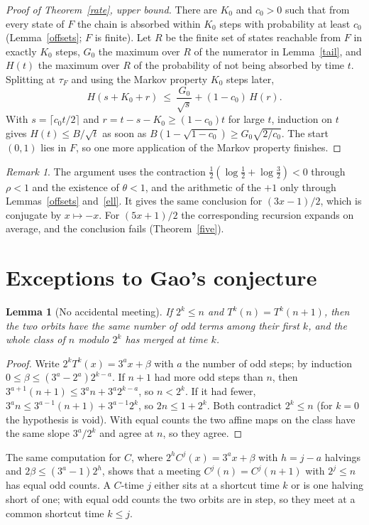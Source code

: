\documentclass[11pt]{article}
\newtheorem{lemma}[theorem]{Lemma}
\theoremstyle{remark}
\newtheorem{remark}[theorem]{Remark}
\begin{document}
\begin{proof}[Proof of Theorem~\ref{rate}, upper bound]
There are $K_0$ and $c_0>0$ such that from every state of $F$ the chain is absorbed within $K_0$
steps with probability at least $c_0$ (Lemma~\ref{offsets}; $F$ is finite). Let $R$ be the finite
set of states reachable from $F$ in exactly $K_0$ steps, $G_0$ the maximum over $R$ of the
numerator in Lemma~\ref{tail}, and $H(t)$ the maximum over $R$ of the probability of not being
absorbed by time $t$. Splitting at $\tau_F$ and using the Markov property $K_0$ steps later,
\[
H(s+K_0+r)\ \le\ \frac{G_0}{\sqrt s}+(1-c_0)\,H(r).
\]
With $s=\lceil c_0t/2\rceil$ and $r=t-s-K_0\ge(1-c_0)t$ for large $t$, induction on $t$ gives
$H(t)\le B/\sqrt t$ as soon as $B(1-\sqrt{1-c_0})\ge G_0\sqrt{2/c_0}$. The start $(0,1)$ lies in
$F$, so one more application of the Markov property finishes.
\end{proof}

\begin{remark}
The argument uses the contraction $\tfrac12(\log\tfrac12+\log\tfrac32)<0$ through $\rho<1$ and the
existence of $\theta<1$, and the arithmetic of the $+1$ only through Lemmas~\ref{offsets}
and~\ref{ell}. It gives the same conclusion for $(3x-1)/2$, which is conjugate by $x\mapsto-x$. For
$(5x+1)/2$ the corresponding recursion expands on average, and the conclusion fails
(Theorem~\ref{five}).
\end{remark}

\section{Exceptions to Gao's conjecture}
\begin{lemma}[No accidental meeting]\label{noacc}
If $2^k\le n$ and $T^k(n)=T^k(n+1)$, then the two orbits have the same number of odd terms among
their first $k$, and the whole class of $n$ modulo $2^k$ has merged at time $k$.
\end{lemma}
\begin{proof}
Write $2^kT^k(x)=3^{a}x+\beta$ with $a$ the number of odd steps; by induction
$0\le\beta\le(3^a-2^a)2^{k-a}$. If $n+1$ had more odd steps than $n$, then
$3^{a+1}(n+1)\le3^an+3^a2^{k-a}$, so $n<2^k$. If it had fewer, $3^{a}n\le3^{a-1}(n+1)+3^{a-1}2^{k}$,
so $2n\le1+2^k$. Both contradict $2^k\le n$ (for $k=0$ the hypothesis is void). With equal counts
the two affine maps on the class have the same slope $3^a/2^k$ and agree at $n$, so they agree.
\end{proof}
The same computation for $C$, where $2^{h}C^j(x)=3^ax+\beta$ with $h=j-a$ halvings and
$2\beta\le(3^a-1)2^h$, shows that a meeting $C^j(n)=C^j(n+1)$ with $2^j\le n$ has equal odd counts.
A $C$-time $j$ either sits at a shortcut time $k$ or is one halving short of one; with equal odd
counts the two orbits are in step, so they meet at a common shortcut time $k\le j$.
\end{document}
